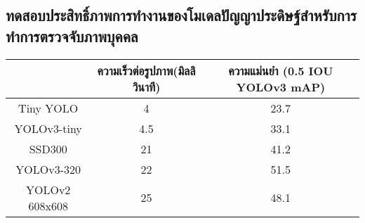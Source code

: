 
\subsection{ทดสอบประสิทธิ์ภาพการทำงานของโมเดลปัญญาประดิษฐ์สำหรับการทำการตรวจจับภาพบุคคล}
\begin{tabular}{|c|c|c|}
		\hline
		{}&{ความเร็วต่อรูปภาพ(มิลลิวินาที)}&{ความแม่นยำ (0.5 IOU YOLOv3 mAP)}			\\
		\hline
		Tiny YOLO	 				& 4				& 23.7														\\
		YOLOv3-tiny				& 4.5				& 33.1				\\
		SSD300					& 21				& 41.2				\\
		YOLOv3-320				& 22				& 51.5				\\	
		YOLOv2 608x608			& 25				& 48.1				\\
	\hline
\end{tabular}
		